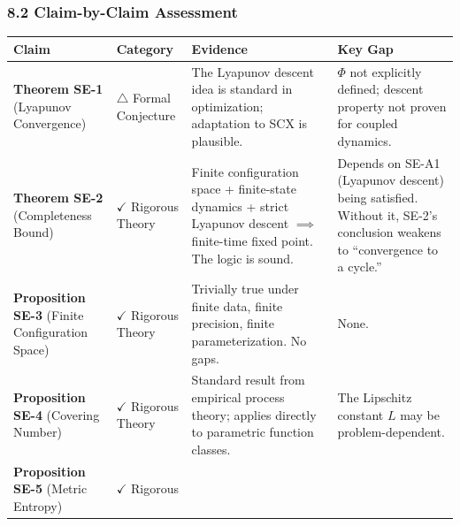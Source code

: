 \documentclass[
  12pt,
]{article}
\begin{document}
\subsubsection{8.2 Claim-by-Claim
Assessment}\label{claim-by-claim-assessment}

\begin{longtable}[]{@{}
  >{\raggedright\arraybackslash}p{}
  >{\raggedright\arraybackslash}p{}
  >{\raggedright\arraybackslash}p{}
  >{\raggedright\arraybackslash}p{}@{}}
\toprule\noalign{}
\begin{minipage}[b]{\linewidth}\raggedright
Claim
\end{minipage} & \begin{minipage}[b]{\linewidth}\raggedright
Category
\end{minipage} & \begin{minipage}[b]{\linewidth}\raggedright
Evidence
\end{minipage} & \begin{minipage}[b]{\linewidth}\raggedright
Key Gap
\end{minipage} \\
\midrule\noalign{}
\endhead
\bottomrule\noalign{}
\endlastfoot
\textbf{Theorem SE-1} (Lyapunov Convergence) & \(\triangle\) Formal
Conjecture & The Lyapunov descent idea is standard in optimization;
adaptation to SCX is plausible. & \(\Phi\) not explicitly defined;
descent property not proven for coupled dynamics. \\
\textbf{Theorem SE-2} (Completeness Bound) & \(\checkmark\) Rigorous
Theory & Finite configuration space + finite-state dynamics + strict
Lyapunov descent \(\implies\) finite-time fixed point. The logic is
sound. & Depends on SE-A1 (Lyapunov descent) being satisfied. Without
it, SE-2's conclusion weakens to ``convergence to a cycle.'' \\
\textbf{Proposition SE-3} (Finite Configuration Space) & \(\checkmark\)
Rigorous Theory & Trivially true under finite data, finite precision,
finite parameterization. No gaps. & None. \\
\textbf{Proposition SE-4} (Covering Number) & \(\checkmark\) Rigorous
Theory & Standard result from empirical process theory; applies directly
to parametric function classes. & The Lipschitz constant \(L\) may be
problem-dependent. \\
\textbf{Proposition SE-5} (Metric Entropy) & \(\checkmark\) Rigorous

\end{longtable}
\end{document}
